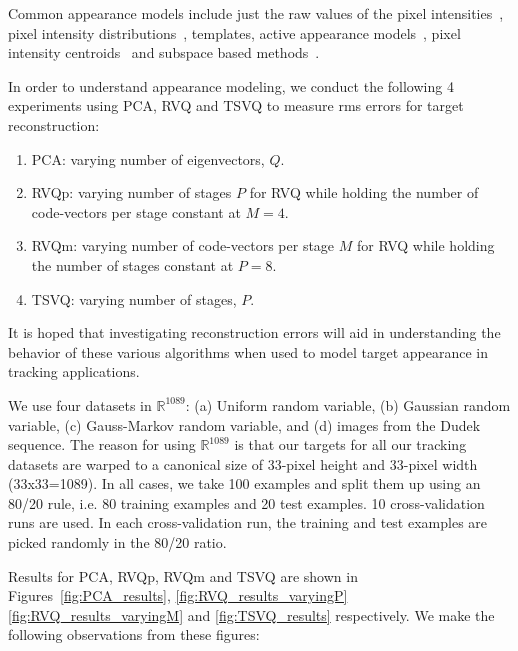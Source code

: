Common appearance models include just the raw values of the pixel intensities~\cite{2000_CNF_TRK_Mallet, 1981_JNL_OpticalFlow_HornSchunck}, pixel intensity distributions~\cite{2002_JNL_MeanShiftFeatureSpaceAnalysis_Comaniciu, 1996_JNL_TRK_Zhu, 2002_JNL_TRK_Paragios, 2002_JNL_TRK_Elgammal}, templates\cite{1997_CNF_TRK_Fieguth}, active appearance models~\cite{1998_CNF_ActiveModels_Edwards, 1995_JNL_ActiveModels_Cootes}, pixel intensity centroids~\cite{1997_CNF_TRK_Heisele} and subspace based methods~\cite{1997_JNL_EigenTRK_Moghaddam, 1998_JNL_Eigentracking_Black}.  

In order to understand appearance modeling, we conduct the following 4 experiments using PCA, RVQ and TSVQ to measure rms errors for target reconstruction:

\begin{enumerate}
\item PCA: varying number of eigenvectors, $Q$.
\item RVQp: varying number of stages $P$ for RVQ while holding the number of code-vectors per stage constant at $M=4$.
\item RVQm: varying number of code-vectors per stage $M$ for RVQ while holding the number of stages constant at $P=8$.
\item TSVQ: varying number of stages, $P$.
\end{enumerate}

It is hoped that investigating reconstruction errors will aid in understanding the behavior of these various algorithms when used to model target appearance in tracking applications.

We use four datasets in $\mathbb{R}^{1089}$: (a) Uniform random variable, (b) Gaussian random variable, (c) Gauss-Markov random variable, and (d) images from the Dudek sequence. The reason for using $\mathbb{R}^{1089}$ is that our targets for all our tracking datasets are warped to a canonical size of 33-pixel height and 33-pixel width (33x33=1089). In all cases, we take 100 examples and split them up using an 80/20 rule, i.e. 80 training examples and 20 test examples. 10 cross-validation runs are used. In each cross-validation run, the training and test examples are picked randomly in the 80/20 ratio.

Results for PCA, RVQp, RVQm and TSVQ are shown in Figures~\ref{fig:PCA_results}, \ref{fig:RVQ_results_varyingP} \ref{fig:RVQ_results_varyingM} and \ref{fig:TSVQ_results} respectively.  We make the following observations from these figures:

